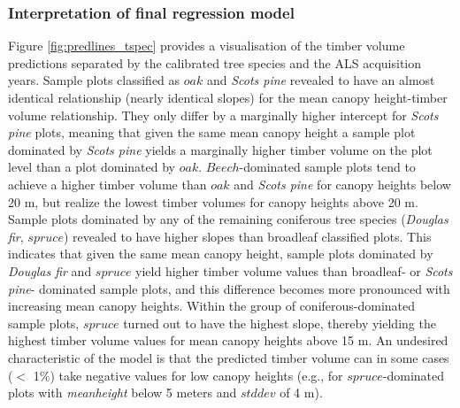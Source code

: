 \subsubsection*{Interpretation of final regression model}
\label{sec:prop_regmod_final}
Figure \ref{fig:predlines_tspec} provides a visualisation of the timber volume predictions separated by the calibrated tree species and the ALS acquisition years. Sample plots classified as $oak$ and \textit{Scots pine} revealed to have an almost identical relationship (nearly identical slopes) for the mean canopy height-timber volume relationship. They only differ by a marginally higher intercept for \textit{Scots pine} plots, meaning that given the same mean canopy height a sample plot dominated by \textit{Scots pine} yields a marginally higher timber volume on the plot level than a plot dominated by $oak$. $Beech$-dominated sample plots tend to achieve a higher timber volume than $oak$ and \textit{Scots pine} for canopy heights below 20 m, but realize the lowest timber volumes for canopy heights above 20 m. Sample plots dominated by any of the remaining coniferous tree species (\textit{Douglas fir}, $spruce$) revealed to have higher slopes than broadleaf classified plots. This indicates that given the same mean canopy height, sample plots dominated by \textit{Douglas fir} and $spruce$ yield higher timber volume values than broadleaf- or \textit{Scots pine}- dominated sample plots, and this difference becomes more pronounced with increasing mean canopy heights. Within the group of coniferous-dominated sample plots, $spruce$ turned out to have the highest slope, thereby yielding the highest timber volume values for mean canopy heights above 15 m. An undesired characteristic of the model is that the predicted timber volume can in some cases ($<$ 1\%) take negative values for low canopy heights (e.g., for $spruce$-dominated plots with \textit{meanheight} below 5 meters and $stddev$ of 4 m). 


